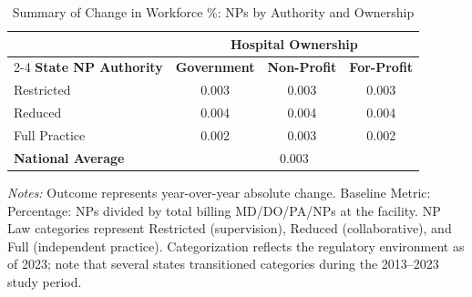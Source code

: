 \begin{table}[htbp]
    \centering
    \caption{Summary of Change in Workforce \%: NPs by Authority and Ownership}
    \label{tab:d_pct_np}
    \vspace{0.2cm}
    \begin{tabular}{lccc}
        \toprule
        & \multicolumn{3}{c}{\textbf{Hospital Ownership}} \\
        \cmidrule(lr){2-4}
        \textbf{State NP Authority} & \textbf{Government} & \textbf{Non-Profit} & \textbf{For-Profit} \\
        \midrule
        Restricted & 0.003 & 0.003 & 0.003 \\
        Reduced & 0.004 & 0.004 & 0.004 \\
        Full Practice & 0.002 & 0.003 & 0.002 \\
        \midrule
        \textbf{National Average} & \multicolumn{3}{c}{0.003} \\
        \bottomrule
    \end{tabular}
    \vspace{0.1cm}
    \begin{minipage}{0.85\textwidth}
        \footnotesize \textit{Notes:} Outcome represents year-over-year absolute change. Baseline Metric: Percentage: NPs divided by total billing MD/DO/PA/NPs at the facility. NP Law categories represent Restricted (supervision), Reduced (collaborative), and Full (independent practice). Categorization reflects the regulatory environment as of 2023; note that several states transitioned categories during the 2013--2023 study period.
    \end{minipage}
\end{table}
